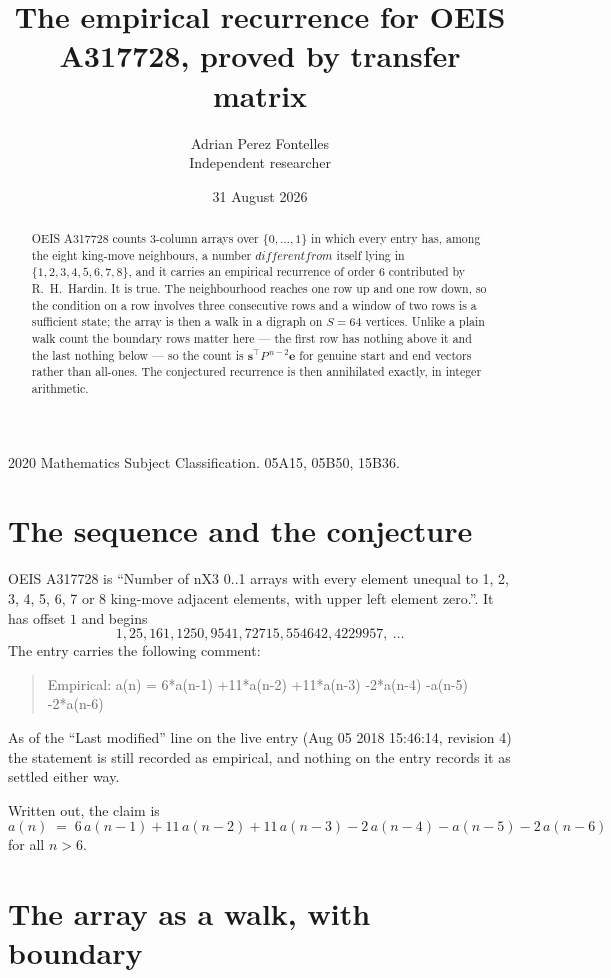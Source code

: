 \documentclass[11pt,a4paper]{article}
\title{The empirical recurrence for OEIS A317728, proved by transfer matrix}
\author{Adrian Perez Fontelles\\ \small Independent researcher}
\date{31 August 2026}
\theoremstyle{plain}
\theoremstyle{definition}
\begin{document}
\maketitle

\begin{abstract}
OEIS A317728 counts $3$-column arrays over $\{0,\dots,1\}$ in which every entry has,
among the eight king-move neighbours, a number $different from$ itself lying in $\{1,2,3,4,5,6,7,8\}$, and it carries an empirical
recurrence of order $6$ contributed by R.~H.~Hardin. It is true. The neighbourhood
reaches one row up and one row down, so the condition on a row involves three consecutive
rows and a window of two rows is a sufficient state; the array is then a walk in a digraph
on $S=64$ vertices. Unlike a plain walk count the boundary rows matter here --- the first
row has nothing above it and the last nothing below --- so the count is
$\mathbf{s}^{\!\top}P^{\,n-2}\mathbf{e}$ for genuine start and end vectors rather than
all-ones. The conjectured recurrence is then annihilated exactly, in integer arithmetic.
\end{abstract}

\noindent\small 2020 Mathematics Subject Classification. 05A15, 05B50, 15B36.\normalsize

\section{The sequence and the conjecture}

OEIS A317728 is ``Number of nX3 0..1 arrays with every element unequal to 1, 2, 3, 4, 5, 6, 7 or 8 king-move adjacent elements, with upper left element zero.''. It has offset
$1$ and begins
\[
1, 25, 161, 1250, 9541, 72715, 554642, 4229957,\ \dots
\]
The entry carries the following comment:
\begin{quote}\small
Empirical: a(n) = 6*a(n-1) +11*a(n-2) +11*a(n-3) -2*a(n-4) -a(n-5) -2*a(n-6)
\end{quote}
As of the ``Last modified'' line on the live entry (Aug 05 2018 15:46:14, revision
4) the statement is still recorded as empirical, and nothing on the entry
records it as settled either way.

Written out, the claim is
\begin{equation}\label{eq:conj}
a(n)\;=\;6\,a(n-1) + 11\,a(n-2) + 11\,a(n-3) - 2\,a(n-4) - a(n-5) - 2\,a(n-6)
\end{equation}
for all $n>6$.

\section{The array as a walk, with boundary}
\end{document}
